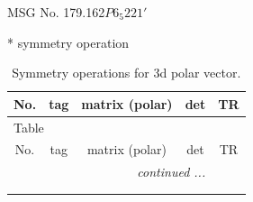 \documentclass[fleqn,8pt]{jsarticle}
\begin{document}
\setcounter{MaxMatrixCols}{32}

\renewcommand{\tablename}{Table~}
\renewcommand{\figurename}{Figure~}
\begin{center}
\LARGE
MSG No. 179.162\quad$P6_{5}221'$
\end{center}
* symmetry operation
\renewcommand{\arraystretch}{1.3}
\begin{longtable}{ccccc}
\caption{Symmetry operations for 3d polar vector.}
 \\
 \hline \hline
No. & tag & matrix (polar) & det & TR \\ \hline \endfirsthead

\multicolumn{4}{l}{\tablename\ \thetable{}} \\
 \hline \hline
No. & tag & matrix (polar) & det & TR \\ \hline \endhead

 \hline \hline
\multicolumn{4}{r}{\footnotesize\it continued ...} \\ \endfoot

 \hline \hline
\multicolumn{4}{r}{} \\ \endlastfoot


\end{longtable}
\end{document}
